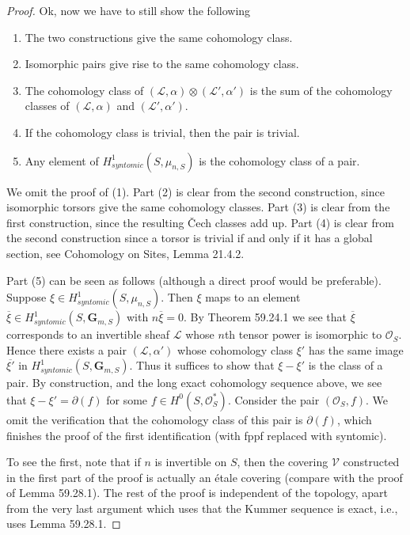 \documentclass[UTF8,11pt]{ctexart}
\theoremstyle{definition}
\begin{document}
\begin{proof}
Ok, now we have to still show the following
\begin{enumerate}
\item The two constructions give the same cohomology class.
\item Isomorphic pairs give rise to the same cohomology class.
\item The cohomology class of $(\mathcal L,\alpha)\otimes(\mathcal L',\alpha')$ is the sum of the cohomology classes of $(\mathcal L,\alpha)$ and $(\mathcal L',\alpha')$.
\item If the cohomology class is trivial, then the pair is trivial.
\item Any element of $H^1_{syntomic}(S,\mu_{n,S})$ is the cohomology class of a pair.
\end{enumerate}
We omit the proof of (1). Part (2) is clear from the second construction, since isomorphic torsors give the same cohomology classes. Part (3) is clear from the first construction, since the resulting \v Cech classes add up. Part (4) is clear from the second construction since a torsor is trivial if and only if it has a global section, see Cohomology on Sites, Lemma 21.4.2.

Part (5) can be seen as follows (although a direct proof would be preferable). Suppose $\xi\in H^1_{syntomic}(S,\mu_{n,S})$. Then $\xi$ maps to an element $\overline\xi\in H^1_{syntomic}(S,\mathbf G_{m,S})$ with $n\overline\xi=0$. By Theorem 59.24.1 we see that $\overline\xi$ corresponds to an invertible sheaf $\mathcal L$ whose $n$th tensor power is isomorphic to $\mathcal O_S$. Hence there exists a pair $(\mathcal L,\alpha')$ whose cohomology class $\xi'$ has the same image $\overline{\xi'}$ in $H^1_{syntomic}(S,\mathbf G_{m,S})$. Thus it suffices to show that $\xi-\xi'$ is the class of a pair. By construction, and the long exact cohomology sequence above, we see that $\xi-\xi'=\partial(f)$ for some $f\in H^0(S,\mathcal O_S^*)$. Consider the pair $(\mathcal O_S,f)$. We omit the verification that the cohomology class of this pair is $\partial(f)$, which finishes the proof of the first identification (with fppf replaced with syntomic).

To see the first, note that if $n$ is invertible on $S$, then the covering $\mathcal V$ constructed in the first part of the proof is actually an étale covering (compare with the proof of Lemma 59.28.1). The rest of the proof is independent of the topology, apart from the very last argument which uses that the Kummer sequence is exact, i.e., uses Lemma 59.28.1.
\end{proof}
\end{document}
